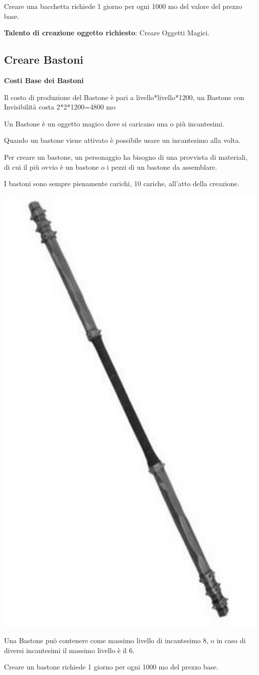 \begin{multicols}{2}
Creare una bacchetta richiede 1 giorno per ogni 1000 mo del valore del prezzo base.

\medskip

\textbf{Talento di creazione oggetto richiesto}: Creare Oggetti Magici.

\subsection{Creare Bastoni}

\textbf{Costi Base dei Bastoni}

\bigskip

Il costo di produzione del Bastone è pari a livello*livello*1200, un Bastone con Invisibilità costa 2*2*1200=4800 mo

\bigskip

Un Bastone è un oggetto magico dove si caricano una o più incantesimi.

Quando un bastone viene attivato è possibile usare un incantesimo alla volta.

Per creare un bastone, un personaggio ha bisogno di una provvista di materiali, di cui il più ovvio è un bastone o i pezzi di un bastone da assemblare.

I bastoni sono sempre pienamente carichi, 10 cariche, all'atto della creazione.

\begin{center}
\includegraphics[width=0.3\linewidth]{immagini/staff2.png}
\end{center}

Una Bastone può contenere come massimo livello di incantesimo 8, o in caso di diversi incantesimi il massimo livello è il 6.

Creare un bastone richiede 1 giorno per ogni 1000 mo del prezzo base.

\medskip


\end{multicols}
